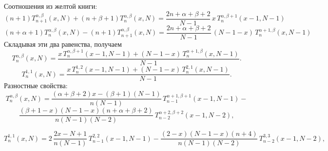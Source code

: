 \documentclass[12pt]{book}
\begin{document}
Соотношения из желтой книги:
\begin{equation*}
  (n+1)T^{\alpha,\beta}_{n+1}(x,N) + (n+\beta+1)T^{\alpha,\beta}_{n}(x,N) = \frac{2n+\alpha+\beta+2}{N-1}\,x\,T^{\alpha,\beta+1}_{n}(x-1,N-1)
\end{equation*}
\begin{equation*}
  (n+\alpha+1)T^{\alpha,\beta}_{n}(x,N) - (n+1)T^{\alpha,\beta}_{n+1}(x,N) = \frac{2n+\alpha+\beta+2}{N-1}\,(N-1-x)\,T^{\alpha+1,\beta}_{n}(x,N-1)
\end{equation*}
Складывая эти два равенства, получаем
\begin{equation*}
  T^{\alpha,\beta}_{n}(x,N)
  = \frac{x\,T^{\alpha,\beta+1}_{n}(x-1,N-1) + (N-1-x)\,T^{\alpha+1,\beta}_{n}(x,N-1)}{N-1}.
\end{equation*}
\begin{equation}\label{rec1221}
  T^{1,1}_{n}(x,N)
  = \frac{x\,T^{1,2}_{n}(x-1,N-1) + (N-1-x)\,T^{2,1}_{n}(x,N-1)}{N-1}.
\end{equation}
Разностные свойства:
\begin{equation*}
 T^{\alpha,\beta}_{n}(x,N) =
  \frac{(\alpha+\beta+2)x - (\beta+1)(N-1)}{n(N-1)}\,T^{\alpha+1,\beta+1}_{n-1}(x-1,N-1)-
\end{equation*}
\begin{equation*}
  \frac{(\beta+1-x)(N-1-x)(n+\alpha+\beta+2)}{n(N-1)(N-2)}\,T^{\alpha+2,\beta+2}_{n-2}(x-1,N-2),
\end{equation*}

\begin{equation*}
 T^{1,1}_{n}(x,N) =
  2\,\frac{2x - N+1}{n(N-1)}\,T^{2,2}_{n-1}(x-1,N-1)-
  \frac{(2-x)(N-1-x)(n+4)}{n(N-1)(N-2)}\,T^{3,3}_{n-2}(x-1,N-2),
\end{equation*}
\end{document}
